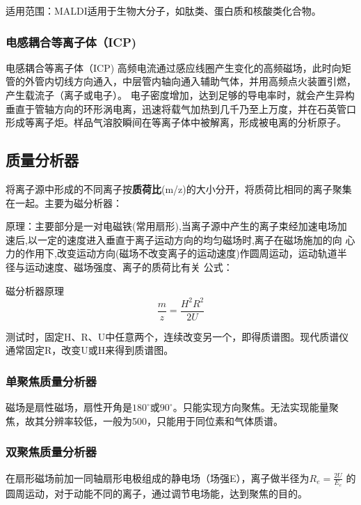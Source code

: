     适用范围：MALDI适用于生物大分子，如肽类、蛋白质和核酸类化合物。

\subsubsection*{电感耦合等离子体（ICP)}
    \begin{definition*}{电感耦合等离子体（ICP)}
        高频电流通过感应线圈产生变化的高频磁场，此时向矩管的外管内切线方向通入，中层管内轴向通入辅助气体，并用高频点火装置引燃，产生载流子（离子或电子）。 电子密度增加，达到足够的导电率时，就会产生异构垂直于管轴方向的环形涡电离，迅速将载气加热到几千乃至上万度，并在石英管口形成等离子炬。样品气溶胶瞬间在等离子体中被解离，形成被电离的分析原子。
    \end{definition*}


\subsection{质量分析器}
将离子源中形成的不同离子按\textbf{质荷比}(m/z)的大小分开，将质荷比相同的离子聚集在一起。主要为磁分析器：

原理：主要部分是一对电磁铁(常用扇形),当离子源中产生的离子束经加速电场加速后,以一定的速度进入垂直于离子运动方向的均匀磁场时,离子在磁场施加的向
心力的作用下,改变运动方向(磁场不改变离子的运动速度)作圆周运动，运动轨道半径与运动速度、磁场强度、离子的质荷比有关
公式：
\begin{theorem*}{磁分析器原理}
    \begin{equation*}
        \frac{m}{z}=\frac{H^{2}R^{2}}{2U}
    \end{equation*}
\end{theorem*}

测试时，固定H、R、U中任意两个，连续改变另一个，即得质谱图。现代质谱仪通常固定R，改变U或H来得到质谱图。
\subsubsection*{单聚焦质量分析器}
磁场是扇性磁场，扇性开角是$180^{\circ}$或$90^{\circ}$。只能实现方向聚焦。无法实现能量聚焦，故其分辨率较低，一般为500，只能用于同位素和气体质谱。
\subsubsection*{双聚焦质量分析器}
在扇形磁场前加一同轴扇形电极组成的静电场（场强E），离子做半径为$R_{e}=\frac{2U}{E_{e}}$
的圆周运动，对于动能不同的离子，通过调节电场能，达到聚焦的目的。

